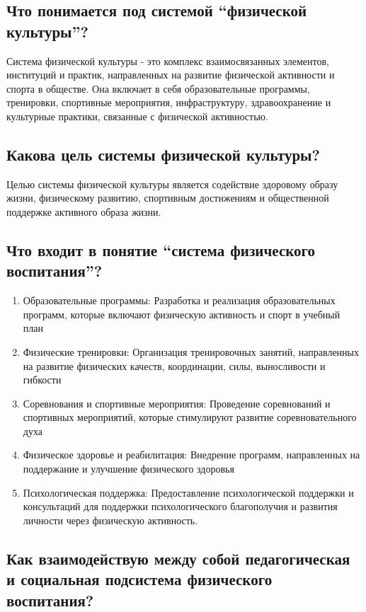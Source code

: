 \subsection{Что понимается под системой ``физической культуры''?}

Система физической культуры - это комплекс взаимосвязанных элементов, институций и практик, направленных на развитие физической активности и спорта в обществе. Она включает в себя образовательные программы, тренировки, спортивные мероприятия, инфраструктуру, здравоохранение и культурные практики, связанные с физической активностью.

\subsection{Какова цель системы физической культуры?}

Целью системы физической культуры является содействие здоровому образу жизни, физическому развитию, спортивным достижениям и общественной поддержке активного образа жизни.

\subsection{Что входит в понятие ``система физического воспитания''?}

\begin{enumerate}
    \item Образовательные программы: Разработка и реализация образовательных программ, которые включают физическую активность и спорт в учебный план
    \item Физические тренировки: Организация тренировочных занятий, направленных на развитие физических качеств, координации, силы, выносливости и гибкости
    \item Соревнования и спортивные мероприятия: Проведение соревнований и спортивных мероприятий, которые стимулируют развитие соревновательного духа
    \item Физическое здоровье и реабилитация: Внедрение программ, направленных на поддержание и улучшение физического здоровья
    \item Психологическая поддержка: Предоставление психологической поддержки и консультаций для поддержки психологического благополучия и развития личности через физическую активность.
\end{enumerate}

\subsection{Как взаимодействую между собой педагогическая и социальная подсистема физического воспитания?}

